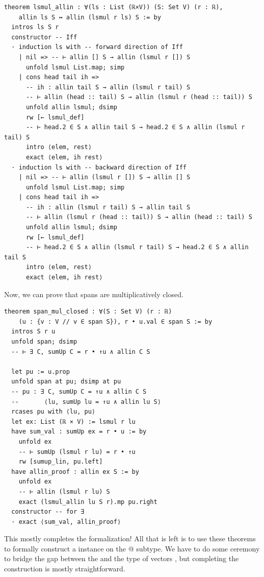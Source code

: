 \documentclass{article}
\begin{document}
\begin{lstlisting}
theorem lsmul_allin : ∀(ls : List (ℝ×V)) (S: Set V) (r : ℝ),
    allin ls S ↔ allin (lsmul r ls) S := by
  intros ls S r
  constructor -- Iff
  · induction ls with -- forward direction of Iff
    | nil => -- ⊢ allin [] S → allin (lsmul r []) S
      unfold lsmul List.map; simp
    | cons head tail ih =>
      -- ih : allin tail S → allin (lsmul r tail) S
      -- ⊢ allin (head :: tail) S → allin (lsmul r (head :: tail)) S
      unfold allin lsmul; dsimp
      rw [← lsmul_def]
      -- ⊢ head.2 ∈ S ∧ allin tail S → head.2 ∈ S ∧ allin (lsmul r tail) S
      intro ⟨elem, rest⟩
      exact ⟨elem, ih rest⟩
  · induction ls with -- backward direction of Iff
    | nil => -- ⊢ allin (lsmul r []) S → allin [] S
      unfold lsmul List.map; simp
    | cons head tail ih =>
      -- ih : allin (lsmul r tail) S → allin tail S
      -- ⊢ allin (lsmul r (head :: tail)) S → allin (head :: tail) S
      unfold allin lsmul; dsimp
      rw [← lsmul_def]
      -- ⊢ head.2 ∈ S ∧ allin (lsmul r tail) S → head.2 ∈ S ∧ allin tail S
      intro ⟨elem, rest⟩
      exact ⟨elem, ih rest⟩
\end{lstlisting}

Now, we can prove that spans are multiplicatively closed.

\begin{lstlisting}
theorem span_mul_closed : ∀(S : Set V) (r : ℝ)
    (u : {v : V // v ∈ span S}), r • u.val ∈ span S := by
  intros S r u
  unfold span; dsimp
  -- ⊢ ∃ C, sumUp C = r • ↑u ∧ allin C S

  let pu := u.prop
  unfold span at pu; dsimp at pu
  -- pu : ∃ C, sumUp C = ↑u ∧ allin C S 
  --       ⟨lu, sumUp lu = ↑u ∧ allin lu S⟩
  rcases pu with ⟨lu, pu⟩
  let ex: List (ℝ × V) := lsmul r lu
  have sum_val : sumUp ex = r • u := by
    unfold ex
    -- ⊢ sumUp (lsmul r lu) = r • ↑u
    rw [sumup_lin, pu.left]
  have allin_proof : allin ex S := by
    unfold ex
    -- ⊢ allin (lsmul r lu) S
    exact (lsmul_allin lu S r).mp pu.right
  constructor -- for ∃
  · exact ⟨sum_val, allin_proof⟩
\end{lstlisting}

This mostly completes the formalization! All that is left is to use these theorems to formally construct a \lstinline@Module@ instance on the @ subtype. We have to do some ceremony to bridge the gap between the \lstinline@Subtype@ and the type of vectors \lstinline@V@, but completing the construction is mostly straightforward.
\end{document}
